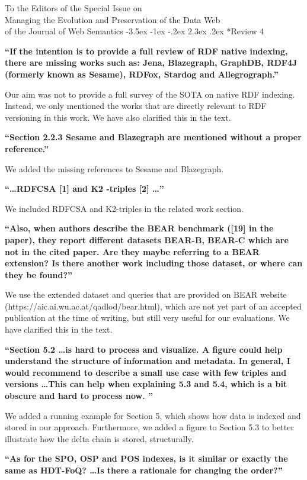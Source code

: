 \documentclass{letter}
\makeatletter
\newcounter{section}
\newcommand\section{\@startsection {section}{1}{\z@}%
                                   {-3.5ex \@plus -1ex \@minus -.2ex}%
                                   {2.3ex \@plus.2ex}%
                                   {\normalfont\Large\bfseries}}
\makeatother
\begin{document}
\begin{letter}{To the Editors of the Special Issue on\\Managing the Evolution and Preservation of the Data Web\\of the Journal of Web Semantics}
\section*{Review 4}

\textbf{\enquote{If the intention is to provide a full review of RDF native indexing, there are missing works such as: Jena, Blazegraph, GraphDB, RDF4J (formerly known as Sesame), RDFox, Stardog and Allegrograph.}}

Our aim was not to provide a full survey of the SOTA on native RDF indexing.
Instead, we only mentioned the works that are directly relevant to RDF versioning in this work.
We have also clarified this in the text.

\textbf{\enquote{Section 2.2.3 Sesame and Blazegraph are mentioned without a proper reference.}}

We added the missing references to Sesame and Blazegraph.

\textbf{\enquote{\ldots RDFCSA [1] and K2 -triples [2] \ldots}}

We included RDFCSA and K2-triples in the related work section.

\textbf{\enquote{Also, when authors describe the BEAR benchmark ([19] in the paper), they report different datasets BEAR-B, BEAR-C which are not in the cited paper. Are they maybe referring to a BEAR extension? Is there another work including those dataset, or where can they be found?}}

We use the extended dataset and queries that are provided on BEAR website \\(https://aic.ai.wu.ac.at/qadlod/bear.html),
which are not yet part of an accepted publication at the time of writing,
but still very useful for our evaluations.
We have clarified this in the text.

\textbf{\enquote{Section 5.2 \ldots is hard to process and visualize. A figure could help understand the structure of information and metadata. In general, I would recommend to describe a small use case with few triples and versions \ldots This can help when explaining 5.3 and 5.4, which is a bit obscure and hard to process now. }}

We added a running example for Section 5, which shows how data is indexed and stored in our approach.
Furthermore, we added a figure to Section 5.3 to better illustrate how the delta chain is stored, structurally.

\textbf{\enquote{As for the SPO, OSP and POS indexes, is it similar or exactly the same as HDT-FoQ? \ldots Is there a rationale for changing the order?}}


\end{letter}
\end{document}
